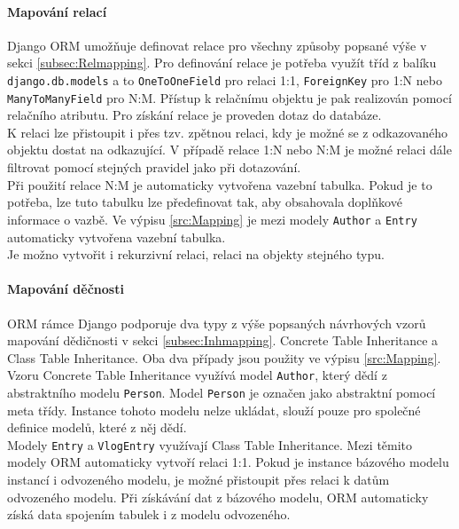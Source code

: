 \documentclass[ing,male,java,dept456]{diploma}						%
\begin{document}
\paragraph{Mapování relací} Django ORM umožňuje definovat relace pro všechny způsoby popsané výše v sekci \ref{subsec:Relmapping}. Pro definování relace je potřeba využít tříd z balíku \lstinline[style=custompython]|django.db.models| a to \lstinline[style=custompython]|OneToOneField| pro relaci 1:1, \lstinline[style=custompython]|ForeignKey| pro 1:N nebo \lstinline[style=custompython]|ManyToManyField| pro N:M. Přístup k relačnímu objektu je pak realizován pomocí relačního atributu. Pro získání relace je proveden dotaz do databáze. \\
K relaci lze přistoupit i přes tzv. zpětnou relaci, kdy je možné se z odkazovaného objektu dostat na odkazující. V případě relace 1:N nebo N:M je možné relaci dále filtrovat pomocí stejných pravidel jako při dotazování. \\
Při použití relace N:M je automaticky vytvořena vazební tabulka. Pokud je to potřeba, lze tuto tabulku lze předefinovat tak, aby obsahovala doplňkové informace o vazbě. Ve výpisu \ref{src:Mapping} je mezi modely \lstinline[style=inlinepython]|Author| a \lstinline[style=inlinepython]|Entry| automaticky vytvořena vazební tabulka. \\
Je možno vytvořit i rekurzivní relaci, relaci na objekty stejného typu. \\

\paragraph{Mapování děčnosti}

ORM rámce Django podporuje dva typy z výše popsaných návrhových vzorů mapování dědičnosti v sekci \ref{subsec:Inhmapping}. Concrete Table Inheritance a Class Table Inheritance. Oba dva případy jsou použity ve výpisu \ref{src:Mapping}. \\
Vzoru Concrete Table Inheritance využívá model \lstinline[style=inlinepython]|Author|, který dědí z abstraktního modelu \lstinline[style=inlinepython]|Person|. Model \lstinline[style=inlinepython]|Person| je označen jako abstraktní pomocí meta třídy. Instance tohoto modelu nelze ukládat, slouží pouze pro společné definice modelů, které z něj dědí. \\
Modely \lstinline[style=inlinepython]|Entry| a \lstinline[style=inlinepython]|VlogEntry| využívají Class Table Inheritance. Mezi těmito modely ORM automaticky vytvoří relaci 1:1. Pokud je instance bázového modelu instancí i odvozeného modelu, je možné přistoupit přes relaci k datům odvozeného modelu. Při získávání dat z bázového modelu, ORM automaticky získá data spojením tabulek i z modelu odvozeného.
\end{document}
